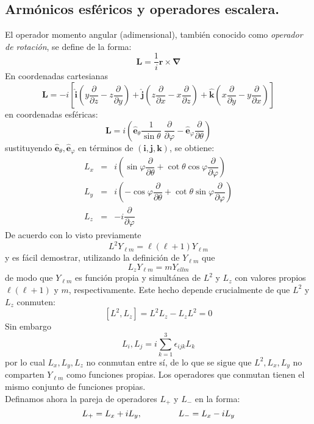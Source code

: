 \subsection{Armónicos esféricos y operadores escalera.}
El operador momento angular (adimensional), también conocido como \emph{operador de rotación}, se define de la forma:
\[ \mathbf{L} = \dfrac{1}{i} \mathbf{r} \times \bm{\nabla} \]
En coordenadas cartesianas
\[  \mathbf{L} = -i \left[ \widehat{\mathbf{i}} \left( y \dfrac{\partial}{\partial z} - z \dfrac{\partial}{\partial y} \right) + \widehat{\mathbf{j}} \left( z \dfrac{\partial}{\partial x} - x \dfrac{\partial}{\partial z} \right) + \widehat{\mathbf{k}} \left( x \dfrac{\partial}{\partial y} - y \dfrac{\partial}{\partial x} \right) \right]  \]
en coordenadas esféricas:
\[  \mathbf{L} = i \left( \widehat{\mathbf{e}}_{\theta} \dfrac{1}{\sin \theta} \; \dfrac{\partial}{\partial \varphi} - \widehat{\mathbf{e}}_{\varphi} \dfrac{\partial}{\partial \theta} \right)  \]
sustituyendo $\widehat{\mathbf{e}}_{\theta}, \widehat{\mathbf{e}}_{\varphi}$ en términos de $(\mathbf{i, j, k})$, se obtiene:
\begin{eqnarray*}
L_{x} &=& i \left( \sin \varphi \dfrac{\partial}{\partial \theta} + \cot \theta \cos \varphi \dfrac{\partial}{\partial \varphi} \right) \nonumber \\
L_{y} &=& i \left( - \cos \varphi \dfrac{\partial}{\partial \theta} + \cot \theta \sin \varphi \dfrac{\partial}{\partial \varphi} \right) \nonumber \\
L_{z} &=& - i \dfrac{\partial}{\partial \varphi} \nonumber
\end{eqnarray*}
De acuerdo con lo visto previamente 
\[ L^{2} Y_{\ell m} = \ell (\ell + 1) Y_{\ell m} \]
y es fácil demostrar, utilizando la definición de $Y_{\ell m}$ que
\[ L_{z} Y_{\ell m} =  m Y_{ell m} \]
de modo que $Y_{\ell m}$ es función propia y simultánea de $L^{2}$ y $L_{z}$ con valores propios $\ell (\ell + 1)$ y $m$, respectivamente. Este hecho depende crucialmente de que $L^{2}$ y $L_{z}$ conmuten:
\[ [L^{2}, L_{z} ] = L^{2} L_{z} - L_{z} L^{2} = 0 \]
Sin embargo
\[ L_{i}, L_{j} = i \sum_{k=1}^{3} \epsilon_{ijk} L_{k} \]
por lo cual $L_{x}, L_{y}, L_{z}$ no conmutan entre sí, de lo que se sigue que $L^{2}, L_{x}, L_{y}$ no comparten $Y_{\ell m}$ como funciones propias. Los operadores que conmutan tienen el mismo conjunto de funciones propias.
\\
Definamos ahora la pareja de operadores $L_{+}$ y $L_{-}$ en la forma:
\[ L_{+} = L_{x} + i L_{y},\hspace{1.5cm} L_{-} = L_{x} - i L_{y}  \]
